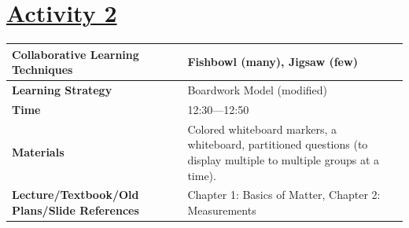 \documentclass{article}
\begin{document}
\section*{\underline{Activity 2}}
\begin{tabular}{|p{4.5cm}|p{9.5cm}|}
\hline
\textbf{Collaborative Learning Techniques} & Fishbowl (many), Jigsaw (few)\\
\hline
\textbf{Learning Strategy} &  Boardwork Model (modified)\\
\hline
\textbf{Time} & 12:30---12:50\\
\hline
\textbf{Materials} & Colored whiteboard markers, a whiteboard, partitioned questions (to display multiple to multiple groups at a time).\\
\hline
\textbf{Lecture/Textbook/Old Plans/Slide References} & Chapter 1: Basics of Matter, Chapter 2: Measurements\\
\hline
\end{tabular}
\end{document}
